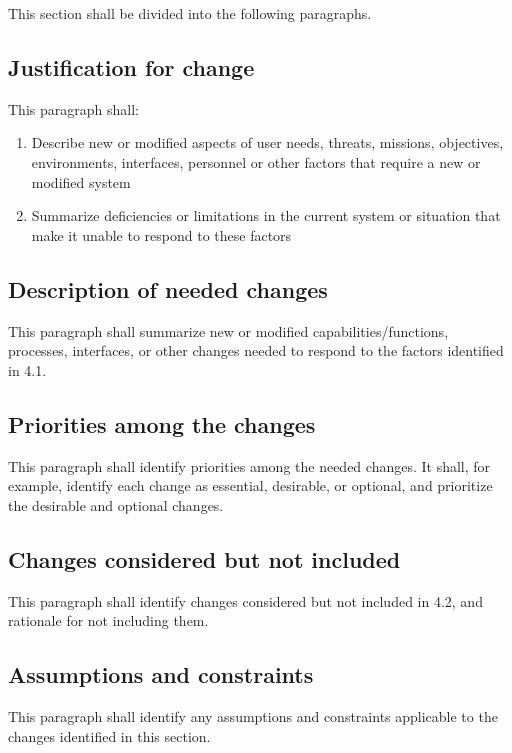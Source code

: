 \documentclass{fidata-report-template}
\begin{document}
This section shall be divided into the following paragraphs.

\subsection{Justification for change}

This paragraph shall:

\begin{enumerate}
\itemsep1pt\parskip0pt
\item
  Describe new or modified aspects of user needs, threats, missions,
  objectives, environments, interfaces, personnel or other factors that
  require a new or modified system
\item
  Summarize deficiencies or limitations in the current system or
  situation that make it unable to respond to these factors
\end{enumerate}

\subsection{Description of needed changes}

This paragraph shall summarize new or modified capabilities/functions,
processes, interfaces, or other changes needed to respond to the factors
identified in 4.1.

\subsection{Priorities among the changes}

This paragraph shall identify priorities among the needed changes. It
shall, for example, identify each change as essential, desirable, or
optional, and prioritize the desirable and optional changes.

\subsection{Changes considered but not included}

This paragraph shall identify changes considered but not included in
4.2, and rationale for not including them.

\subsection{Assumptions and constraints}

This paragraph shall identify any assumptions and constraints applicable
to the changes identified in this section.
\end{document}
